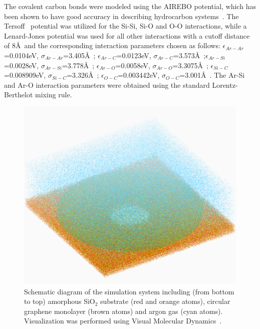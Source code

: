 The covalent carbon bonds were modeled using the AIREBO\cite{stuartJCP2000} potential, which has been shown to have good accuracy in describing hydrocarbon systems~\cite{qiNANO2010,zhaoJAP2010}.  The Tersoff~\cite{tersoffPRB1988} potential was utilized for the Si-Si, Si-O and O-O interactions, while a Lenard-Jones potential was used for all other interactions with a cutoff distance of 8\AA \ and the corresponding interaction parameters chosen as follows: $\epsilon_{Ar-Ar}$=0.0104eV, $\sigma_{Ar-Ar}$=3.405\AA~\cite{RytkonenJchemp1998}; $\epsilon_{Ar-C}$=0.0123eV, $\sigma_{Ar-C}$=3.573\AA~\cite{RobertNano1996};$\epsilon_{Ar-Si}$=0.0028eV, $\sigma_{Ar-Si}$=3.778\AA~\cite{LiPRA2010}; $\epsilon_{Ar-O}$=0.0058eV, $\sigma_{Ar-O}$=3.3075\AA~\cite{EverittJCP1999}; $\epsilon_{Si-C}$=0.008909eV, $\sigma_{Si-C}$=3.326\AA~\cite{OngPRB2010}; $\epsilon_{O-C}$=0.003442eV, $\sigma_{O-C}$=3.001\AA~\cite{OngPRB2010}.  The Ar-Si and Ar-O interaction parameters were obtained using the standard Lorentz-Berthelot mixing rule.

\begin{figure}
\begin{center} \begin{center}
\includegraphics[scale=0.15]{Figs_Friction/MD.pdf}
\end{center}
\caption{\label{MD} Schematic diagram of the simulation system including (from bottom to top) amorphous SiO$_{2}$ substrate (red and orange atoms), circular graphene monolayer (brown atoms) and argon gas (cyan atoms). Visualization was performed using Visual Molecular Dynamics~\cite{Humphrey1996}.}
 \end{center} \end{figure}

